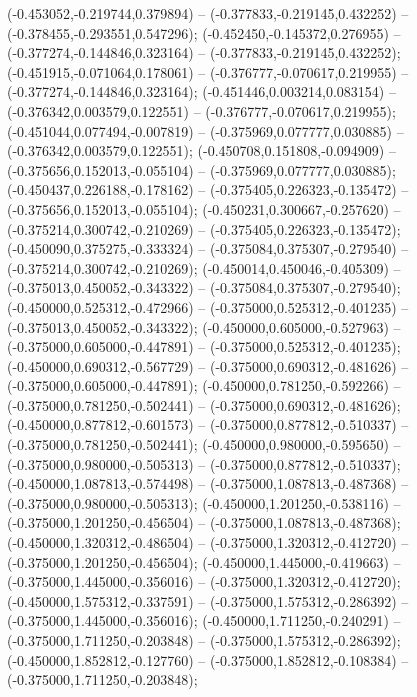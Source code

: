  (-0.453052,-0.219744,0.379894) -- (-0.377833,-0.219145,0.432252) -- (-0.378455,-0.293551,0.547296);
 (-0.452450,-0.145372,0.276955) -- (-0.377274,-0.144846,0.323164) -- (-0.377833,-0.219145,0.432252);
 (-0.451915,-0.071064,0.178061) -- (-0.376777,-0.070617,0.219955) -- (-0.377274,-0.144846,0.323164);
 (-0.451446,0.003214,0.083154) -- (-0.376342,0.003579,0.122551) -- (-0.376777,-0.070617,0.219955);
 (-0.451044,0.077494,-0.007819) -- (-0.375969,0.077777,0.030885) -- (-0.376342,0.003579,0.122551);
 (-0.450708,0.151808,-0.094909) -- (-0.375656,0.152013,-0.055104) -- (-0.375969,0.077777,0.030885);
 (-0.450437,0.226188,-0.178162) -- (-0.375405,0.226323,-0.135472) -- (-0.375656,0.152013,-0.055104);
 (-0.450231,0.300667,-0.257620) -- (-0.375214,0.300742,-0.210269) -- (-0.375405,0.226323,-0.135472);
 (-0.450090,0.375275,-0.333324) -- (-0.375084,0.375307,-0.279540) -- (-0.375214,0.300742,-0.210269);
 (-0.450014,0.450046,-0.405309) -- (-0.375013,0.450052,-0.343322) -- (-0.375084,0.375307,-0.279540);
 (-0.450000,0.525312,-0.472966) -- (-0.375000,0.525312,-0.401235) -- (-0.375013,0.450052,-0.343322);
 (-0.450000,0.605000,-0.527963) -- (-0.375000,0.605000,-0.447891) -- (-0.375000,0.525312,-0.401235);
 (-0.450000,0.690312,-0.567729) -- (-0.375000,0.690312,-0.481626) -- (-0.375000,0.605000,-0.447891);
 (-0.450000,0.781250,-0.592266) -- (-0.375000,0.781250,-0.502441) -- (-0.375000,0.690312,-0.481626);
 (-0.450000,0.877812,-0.601573) -- (-0.375000,0.877812,-0.510337) -- (-0.375000,0.781250,-0.502441);
 (-0.450000,0.980000,-0.595650) -- (-0.375000,0.980000,-0.505313) -- (-0.375000,0.877812,-0.510337);
 (-0.450000,1.087813,-0.574498) -- (-0.375000,1.087813,-0.487368) -- (-0.375000,0.980000,-0.505313);
 (-0.450000,1.201250,-0.538116) -- (-0.375000,1.201250,-0.456504) -- (-0.375000,1.087813,-0.487368);
 (-0.450000,1.320312,-0.486504) -- (-0.375000,1.320312,-0.412720) -- (-0.375000,1.201250,-0.456504);
 (-0.450000,1.445000,-0.419663) -- (-0.375000,1.445000,-0.356016) -- (-0.375000,1.320312,-0.412720);
 (-0.450000,1.575312,-0.337591) -- (-0.375000,1.575312,-0.286392) -- (-0.375000,1.445000,-0.356016);
 (-0.450000,1.711250,-0.240291) -- (-0.375000,1.711250,-0.203848) -- (-0.375000,1.575312,-0.286392);
 (-0.450000,1.852812,-0.127760) -- (-0.375000,1.852812,-0.108384) -- (-0.375000,1.711250,-0.203848);
